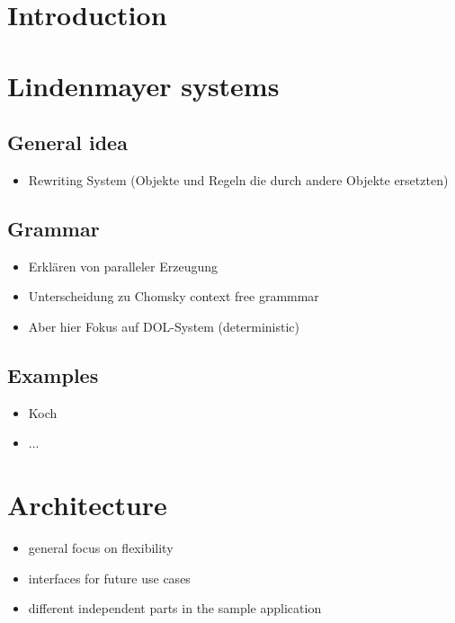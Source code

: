 \documentclass[english]{cpp-hmwk}
\begin{document}
\section{Introduction}
   
\pagebreak
\section{Lindenmayer systems}
\subsection{General idea}
   
\begin{itemize}
	\item Rewriting System (Objekte und Regeln die durch andere Objekte ersetzten)
\end{itemize}


\subsection{Grammar}

\begin{itemize}
	\item Erklären von paralleler Erzeugung
	\item Unterscheidung zu Chomsky context free grammmar
	\item Aber hier Fokus auf DOL-System (deterministic)
\end{itemize}

\subsection{Examples}

\begin{itemize}
	\item Koch
	\item ...
\end{itemize}
   
\pagebreak
\section{Architecture}
\begin{itemize}
	\item general focus on flexibility
	\item interfaces for future use cases
	\item different independent parts in the sample application
\end{itemize}
\end{document}
